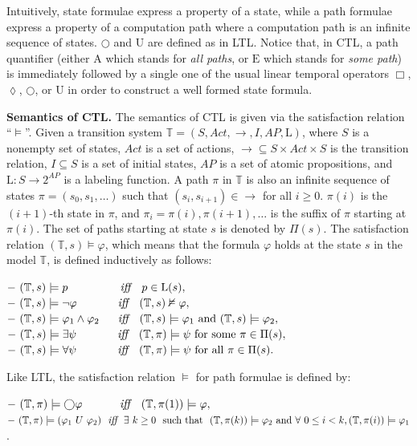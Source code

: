 \noindent Intuitively, state formulae express a property of a state, while a path formulae express a property of a computation path where a computation path is an infinite sequence of states. $\bigcirc$ and $\mathrm{U}$ are defined as in LTL. Notice that, in CTL, a path quantifier (either $\mathrm{A}$ which stands for \textit{all paths}, or $\mathrm{E}$ which stands for \textit{some path}) is immediately followed by a single one of the usual linear
temporal operators $\Box$, $\lozenge$, $\bigcirc$, or $\mathrm{U}$ in order to construct a well formed state formula.

\noindent \textbf{Semantics of CTL.} The semantics of CTL is given via the satisfaction relation ``$\models$''. Given a transition system $\mathbb{T} =(S, Act, \rightarrow, I, AP, \mathrm{L})$, where $S$ is a nonempty set of states, $Act$ is a set of actions, $\rightarrow\subseteq S\times Act \times S$ is the transition relation, $I\subseteq S$ is a set of initial states, $AP$ is a set of atomic propositions, and $\mathrm{L}: S \to 2^{AP}$ is a labeling function. A path $\pi$ in $\mathbb{T}$ is also an infinite sequence of states $\pi=(s_0,s_1,\dots)$ such that $(s_i,s_{i+1})\in \rightarrow$ for all $i\geq 0$. $\pi(i)$ is the $(i+1)$-th state in $\pi$, and $\pi_i = \pi(i), \pi(i+1), \dots$ is the suffix of $\pi$ starting at $\pi(i)$. The set of paths starting at state $s$ is denoted by $\Pi(s)$. The satisfaction relation $(\mathbb{T},s)\models \varphi$, which means that the formula $\varphi$ holds at the state $s$ in the model $\mathbb{T}$, is defined inductively as follows:


\noindent $-~(\mathbb{T},s) \models p ~~~~~~~~~~~~~~\emph{iff}~~~ p\in \mathrm{L}(s),$\\
$-~(\mathbb{T},s) \models \neg \varphi ~~~~~~~~~~~\emph{iff}~~~ (\mathbb{T},s)\nvDash \varphi,$\\
$-~(\mathbb{T},s) \models \varphi_1 \wedge \varphi_2 ~~~~~\emph{iff}~~~(\mathbb{T},s)\models \varphi_1~\textrm{and}~(\mathbb{T},s) \models \varphi_2,$ \\
$-~(\mathbb{T},s) \models \exists \psi ~~~~~~~~~~~\emph{iff}~~~ (\mathbb{T},\pi) \models \psi ~\textrm{for~some}~ \pi \in \Pi(s),$\\
$-~(\mathbb{T},s) \models \forall \psi ~~~~~~~~~~~\emph{iff}~~~ (\mathbb{T},\pi) \models \psi ~\textrm{for~all}~ \pi \in \Pi(s).$

\noindent Like LTL, the satisfaction relation $\models$ for path formulae is defined by:

\noindent $-~(\mathbb{T},\pi) \models \bigcirc\varphi ~~~~~~~~~~\emph{iff}~~~ (\mathbb{T},\pi(1)) \models \varphi,$\\
$-~(\mathbb{T},\pi) \models (\varphi_1~U~\varphi_2)~~\emph{iff}~~\exists~ k \geq 0~~\textrm{such that}~~ (\mathbb{T},\pi(k)) \models \varphi_2 ~\textrm{and}~\forall~ 0\leq i < k, (\mathbb{T},\pi(i)) \models \varphi_1$.


